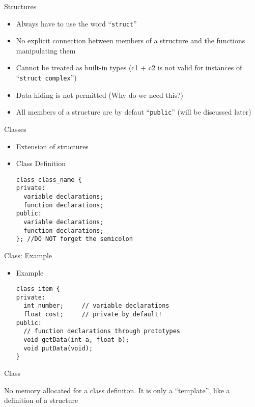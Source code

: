\documentclass{beamer}
\begin{document}
\begin{frame}[fragile]{Structures}
  \begin{itemize}
  \item Always have to use the word ``\texttt{struct}''\pause
  \item No explicit connection between members of a structure and the functions manipulating them\pause
  \item Cannot be treated as built-in types (c1 + c2 is not valid for instances of ``\texttt{struct complex}'')\pause
  \item Data hiding is not permitted (Why do we need this?)\pause
  \item All members of a structure are by defaut ``\texttt{public}'' (will be discussed later)
  \end{itemize}
\end{frame}

\begin{frame}[fragile]{Classes}
  \begin{itemize}
  \item Extension of structures\pause
  \item Class Definition
    \begin{lstlisting}
class class_name {
private:
  variable declarations;
  function declarations;
public:
  variable declarations;
  function declarations;
}; //DO NOT forget the semicolon
    \end{lstlisting}
  \end{itemize}
\end{frame}

\begin{frame}[fragile]{Class: Example}
  \begin{itemize}
  \item Example
    \begin{lstlisting}
class item {
private:
  int number;     // variable declarations
  float cost;     // private by default!
public:
  // function declarations through prototypes
  void getData(int a, float b);    
  void putData(void);             
}
    \end{lstlisting}
  \end{itemize}
\end{frame}

\begin{frame}[fragile]{Class}
  \begin{center}
    \alert{No memory allocated for a class definiton. It is only a ``template'', like a definition of a structure}
  \end{center}
\end{frame}
\end{document}
